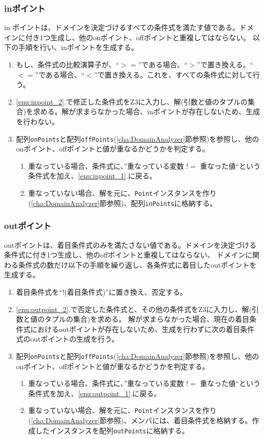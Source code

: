 \documentclass[uplatex, report, a4j, 10pt]{jsbook}
\newcommand\ttt[1]{\texttt{#1}}
\begin{document}
\subsubsection{inポイント}
in ポイントは、ドメインを決定づけるすべての条件式を満たす値である。ドメインに付き1つ生成し、他のonポイント、offポイントと重複してはならない。
以下の手順を行い、inポイントを生成する。
\begin{enumerate}
  \item\label{enu:inpoint_2} もし、条件式の比較演算子が、“$>=$”である場合、“$>$”で置き換える。“$<=$”である場合、“$<$”で置き換える。これを、すべての条件式に対して行う。
  \item\label{enu:inpoint_1} \ref{enu:inpoint_2}.で修正した条件式をZ3に入力し、解(引数と値のタプルの集合)を求める。解が求まらなかった場合、inポイントが存在しないため、生成を行わない。
  \item 配列\ttt{onPoints}と配列\ttt{offPoints}(\ref{cha:DomainAnalyzer}節参照)を参照し、他のonポイント、offポイントと値が重なるかどうかを判定する。
        \begin{enumerate}
          \item 重なっている場合、条件式に、”重なっている変数 $!=$ 重なった値“という条件式を加え、\ref{enu:inpoint_1}.に戻る。
          \item 重なっていない場合、解を元に、\ttt{Point}インスタンスを作り(\ref{cha:DomainAnalyzer}節参照)、配列\ttt{inPoints}に格納する。
        \end{enumerate}
\end{enumerate}

\subsubsection{outポイント}
outポイントは、着目条件式のみを満たさない値である。ドメインを決定づける条件式に付き1つ生成し、他のoffポイントと重複してはならない、
ドメインに関わる条件式の数だけ以下の手順を繰り返し、各条件式に着目したoutポイントを生成する。
\begin{enumerate}
  \item\label{enu:outpoint_2} 着目条件式を“$!$(着目条件式)”に置き換え、否定する。
  \item\label{enu:outpoint_1} \ref{enu:outpoint_2}.で否定した条件式と、その他の条件式をZ3に入力し、解(引数と値のタプルの集合)を求める。
        解が求まらなかった場合、現在の着目条件式におけるoutポイントが存在しないため、生成を行わずに次の着目条件式のoutポイントの生成を行う。
  \item 配列\ttt{onPoints}と配列\ttt{offPoints}(\ref{cha:DomainAnalyzer}節参照)を参照し、他のonポイント、offポイントと値が重なるかどうかを判定する。
        \begin{enumerate}
          \item 重なっている場合、条件式に、”重なっている変数 $!=$ 重なった値“という条件式を加え、\ref{enu:outpoint_1}.に戻る。
          \item 重なっていない場合、解を元に、\ttt{Point}インスタンスを作り(\ref{cha:DomainAnalyzer}節参照)、メンバ\forcusedConditionalExpression{}には、着目条件式を格納する。作成したインスタンスを配列\ttt{outPoints}に格納する。
        \end{enumerate}
\end{enumerate}
\end{document}
